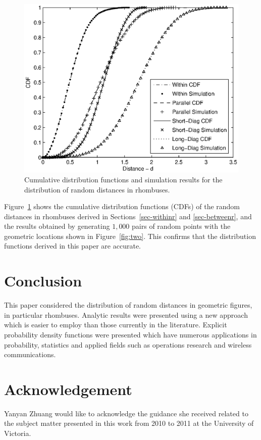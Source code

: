 \documentclass[12pt,draftclsnofoot,onecolumn]{IEEEtran}
\begin{document}
\begin{figure}
  \centering
  \includegraphics[width=0.6\columnwidth]{fig/rhombus_cdf}
  \caption{Cumulative distribution functions and simulation results for the
  distribution of random distances in rhombuses.}
  \label{fig:cdf}
\end{figure}

Figure~\ref{fig:cdf} shows the cumulative
distribution functions (CDFs) of the random distances
in rhombuses derived in Sections~\ref{sec-withinr} and \ref{sec-betweenr},
and the results obtained by generating $1,000$ pairs of random points with the geometric
locations shown in Figure~\ref{fig:two}.
This confirms that the distribution functions derived in this paper are accurate.

\section{Conclusion}
This paper considered the distribution of random distances in geometric figures,
in particular rhombuses.
Analytic results were presented using a new approach which is easier to
employ than those currently in the literature.
Explicit probability density functions were presented which 
have numerous applications in probability, statistics and applied fields
such as operations research and wireless communications.

\section*{Acknowledgement}
Yanyan Zhuang would like to acknowledge the guidance she received related to the
subject matter presented in this work from 2010 to 2011 at the University of
Victoria.



\end{document}
